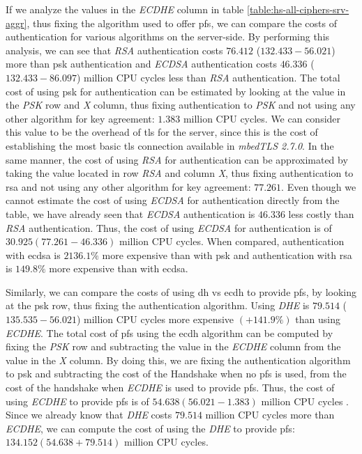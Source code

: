 If we analyze the values in the \textit{ECDHE} column in table \ref{table:hs-all-ciphers-srv-aggr}, thus fixing the
algorithm used to offer \gls{pfs}, we can compare the costs of authentication for various algorithms on the server-side.
By performing this analysis, we can see that \textit{RSA} authentication costs $76.412$ ($132.433-56.021$) more than \gls{psk}
authentication and \textit{ECDSA} authentication costs $46.336$ ($132.433-86.097$) million CPU cycles less
than \textit{RSA} authentication. The total cost of using \gls{psk} for authentication can be estimated
by looking at the
value in the \textit{PSK} row and \textit{X} column, thus fixing authentication to \textit{PSK} and not using any other
algorithm for key agreement: $1.383$ million CPU cycles. We can consider this value to be the overhead of \gls{tls} for the server,
since this is the cost of establishing the most basic \gls{tls} connection available in \textit{mbedTLS 2.7.0}.
In the same manner, the cost of using \textit{RSA} for authentication can
be approximated by taking the value located in row \textit{RSA} and column \textit{X}, thus fixing authentication
to \gls{rsa} and not using any other algorithm for key agreement: $77.261$. Even though we cannot estimate the cost
of using \textit{ECDSA} for authentication directly from the table, we have already seen that \textit{ECDSA} authentication
is $46.336$ less costly than \textit{RSA} authentication. Thus, the cost of using \textit{ECDSA} for authentication
is of $30.925 (77.261-46.336)$ million CPU cycles. When compared, authentication with \gls{ecdsa} is
$2136.1\%$ more expensive than with \gls{psk} and authentication with \gls{rsa} is $149.8\%$ more expensive
than with \gls{ecdsa}.

Similarly, we can compare the costs of using \gls{dh} vs \gls{ecdh} to provide \gls{pfs}, by
looking at the \gls{psk} row, thus fixing the authentication algorithm. Using \textit{DHE} is
$79.514$ ($135.535 - 56.021$) million CPU cycles more expensive $(+141.9\%)$ than using \textit{ECDHE}. The total cost of \gls{pfs}
using the \gls{ecdh} algorithm can be computed by fixing the \textit{PSK} row 
and subtracting the value in the \textit{ECDHE} column from the value in the \textit{X} column. By doing this, we are
fixing the authentication algorithm to \gls{psk} and subtracting the cost of the Handshake when no \gls{pfs} is used,
from the cost of the handshake when \textit{ECDHE} is used to provide \gls{pfs}. Thus, the cost of using \textit{ECDHE}
to provide \gls{pfs} is of $54.638 (56.021-1.383)$ million CPU cycles . Since we already know that \textit{DHE} costs
$79.514$ million CPU cycles more than \textit{ECDHE}, we can compute the cost of using the \textit{DHE} to
provide \gls{pfs}: $134.152 (54.638+79.514)$ million CPU cycles.

